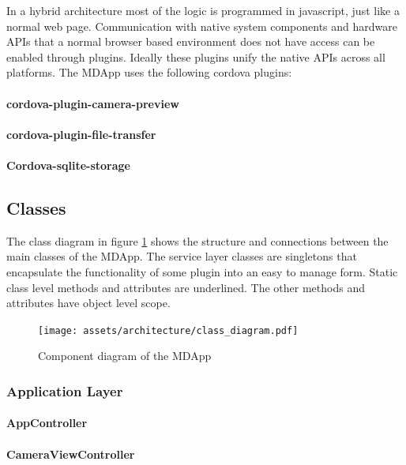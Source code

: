 In a hybrid architecture most of the logic is programmed in javascript, just like a normal web page. Communication with native system components and hardware APIs that a normal browser based environment does not have access can be enabled through plugins. Ideally these plugins unify the native APIs across all platforms. The MDApp uses the following cordova plugins:

   \paragraph{cordova-plugin-camera-preview}
   \paragraph{cordova-plugin-file-transfer}
   \paragraph{Cordova-sqlite-storage}

\subsection{Classes}

The class diagram in figure \ref{fig:class_dia} shows the structure and connections between the main classes of the MDApp. The service layer classes are singletons that encapsulate the functionality of some plugin into an easy to manage form. Static class level methods and attributes are underlined. The other methods and attributes have object level scope.

\begin{figure}[H]
    \centering
    \texttt{[image: assets/architecture/class\_diagram.pdf]}
    \caption{Component diagram of the MDApp}
    \label{fig:class_dia}
\end{figure}

    \subsubsection{Application Layer}
        \paragraph{AppController}
            
        \paragraph{CameraViewController}
            
